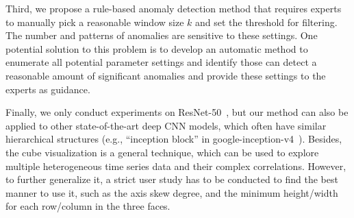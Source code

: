 \documentclass[format=acmsmall, review=false, screen=true]{acmart}
\newcommand{\name}{{DeepTracker}\xspace}
\newcommand{\ti}{\textcolor[rgb]{0,0,0}}
\begin{document}
Third, we propose a rule-based anomaly detection method that requires experts to manually pick a reasonable window size $k$ and set the threshold for filtering. The number and patterns of anomalies are sensitive to these settings. One potential solution to this problem is to develop an automatic method to enumerate all potential parameter settings and identify those can detect a reasonable amount of significant anomalies and provide these settings to the experts as guidance.

Finally, we only conduct experiments on ResNet-50~\cite{he2016deep}, but our method can also be applied to other state-of-the-art deep CNN models, which often have similar hierarchical structures (e.g., ``inception block'' in google-inception-v4~\cite{szegedy2016inception}).
Besides, the cube visualization is a general technique, which can be used to explore multiple heterogeneous time series data and their complex correlations.
However, to further generalize it, a strict user study has to be conducted to find the best manner to use it, such as the axis skew degree, and the minimum height/width for each row/column in the three faces.
\end{document}
